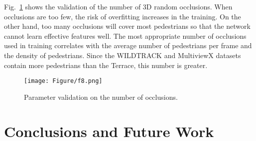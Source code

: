 \documentclass[runningheads]{llncs}
\begin{document}
	Fig.~\ref{f8} shows the validation of the number of 3D random occlusions. When occlusions are too few, the risk of overfitting increases in the training. On the other hand, too many occlusions will cover most pedestrians so that the network cannot learn effective features well. The most appropriate number of occlusions used in training correlates with the average number of pedestrians per frame and the density of pedestrians. Since the WILDTRACK and MultiviewX datasets contain more pedestrians than the Terrace, this number is greater.
	
	\begin{table}[t]
		\begin{center}
			\caption{A comparison of data augmentation schemes (with 5-layer projection applied).}
			\label{tab:validation_augmentation}
		\end{center}
	\end{table}
	
	\begin{figure}
		\centering
		\texttt{[image: Figure/f8.png]}
\caption{Parameter validation on the number of occlusions.}
		\label{f8}
	\end{figure}
	
	
	\section{Conclusions and Future Work}
	
\end{document}

